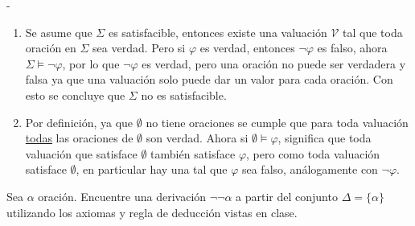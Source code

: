 \begin{sol}
    -\begin{enumerate}[label=(\alph*)]
        \item Se asume que $\Sigma$ es satisfacible, entonces existe una valuación $\mathcal{V}$ tal que toda oración en $\Sigma$ sea verdad. Pero si $\varphi$ es verdad, entonces $\neg\varphi$ es falso, ahora $\Sigma\models\neg\varphi$, por lo que $\neg\varphi$ es verdad, pero una oración no puede ser verdadera y falsa ya que una valuación solo puede dar un valor para cada oración. Con esto se concluye que $\Sigma$ no es satisfacible.
        \item Por definición, ya que $\emptyset$ no tiene oraciones se cumple que para toda valuación \underline{todas} las oraciones de $\emptyset$ son verdad. Ahora si $\emptyset\models\varphi$, significa que toda valuación que satisface $\emptyset$ también satisface $\varphi$, pero como toda valuación satisface $\emptyset$, en particular hay una tal que $\varphi$ sea falso, análogamente con $\neg\varphi$.
    \end{enumerate}
\end{sol}

\begin{prob}[5 pts]
    Sea $\alpha$ oración. Encuentre una derivación $\neg \neg \alpha$ a partir del conjunto $\Delta=\{\alpha\}$ utilizando los axiomas y regla de deducción vistas en clase.
\end{prob}

